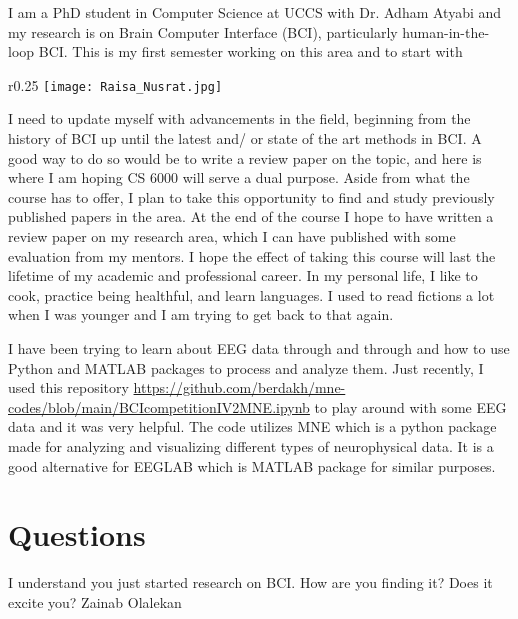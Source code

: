 

% 


I am a PhD student in Computer Science at UCCS with Dr. Adham Atyabi and my research is on Brain Computer Interface (BCI), particularly human-in-the-loop BCI. This is my first semester working on this area and to start with 
\begin{wrapfigure}{r}{0.25\textwidth} %
    \centering
    \texttt{[image: Raisa\_Nusrat.jpg]}
\end{wrapfigure}
I need to update myself with advancements in the field, beginning from the history of BCI up until the latest and/ or state of the art methods in BCI. A good way to do so would be to write a review paper on the topic, and here is where I am hoping CS 6000 will serve a dual purpose. Aside from what the course has to offer, I plan to take this opportunity to find and study previously published papers in the area. At the end of the course I hope to have written a review paper on my research area, which I can have published with some evaluation from my mentors. I hope the effect of taking this course will last the lifetime of my academic and professional career. In my personal life, I like to cook, practice being healthful, and learn languages. I used to read fictions a lot when I was younger and I am trying to get back to that again. 
\vspace{.25 cm}

I have been trying to learn about EEG data through and through and how to use Python and MATLAB packages to process and analyze them. Just recently, I used this repository \url{https://github.com/berdakh/mne-codes/blob/main/BCIcompetitionIV2MNE.ipynb} to play around with some EEG data and it was very helpful. The code utilizes MNE which is a python package made for analyzing and visualizing different types of neurophysical data. It is a good alternative for EEGLAB which is MATLAB package for similar purposes.

\section{Questions}

I understand you just started research on BCI. How are you finding it? Does it excite you? Zainab Olalekan
%
